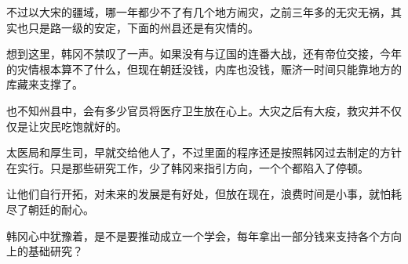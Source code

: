 不过以大宋的疆域，哪一年都少不了有几个地方闹灾，之前三年多的无灾无祸，其实也只是路一级的安定，下面的州县还是有灾情的。

想到这里，韩冈不禁叹了一声。如果没有与辽国的连番大战，还有帝位交接，今年的灾情根本算不了什么，但现在朝廷没钱，内库也没钱，赈济一时间只能靠地方的库藏来支撑了。

也不知州县中，会有多少官员将医疗卫生放在心上。大灾之后有大疫，救灾并不仅仅是让灾民吃饱就好的。

太医局和厚生司，早就交给他人了，不过里面的程序还是按照韩冈过去制定的方针在实行。只是那些研究工作，少了韩冈来指引方向，一个个都陷入了停顿。

让他们自行开拓，对未来的发展是有好处，但放在现在，浪费时间是小事，就怕耗尽了朝廷的耐心。

韩冈心中犹豫着，是不是要推动成立一个学会，每年拿出一部分钱来支持各个方向上的基础研究？

